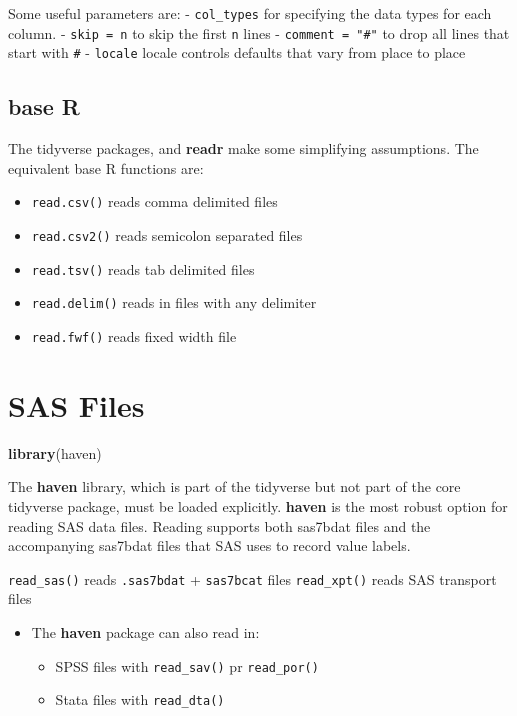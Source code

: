 \documentclass[]{book}
\newenvironment{Shaded}{\begin{snugshade}}{\end{snugshade}}
\newcommand{\KeywordTok}[1]{\textcolor[rgb]{0.13,0.29,0.53}{\textbf{#1}}}
\newcommand{\NormalTok}[1]{#1}
\providecommand{\tightlist}{%
  \setlength{\itemsep}{0pt}\setlength{\parskip}{0pt}}
\newenvironment{rmdblock}[1]
  {\begin{shaded*}
  \begin{itemize}
  \renewcommand{\labelitemi}{
    \raisebox{-.7\height}[0pt][0pt]{
      {\setkeys{Gin}{width=3em,keepaspectratio}\texttt{[image: images/\#1]}}
    }
  }
  \item
  }
  {
  \end{itemize}
  \end{shaded*}
  }
\newenvironment{rmdnote}
  {\begin{rmdblock}{note}}
  {\end{rmdblock}}
\theoremstyle{definition}
\theoremstyle{definition}
\theoremstyle{definition}
\theoremstyle{remark}
\begin{document}
Some useful parameters are: - \texttt{col\_types} for specifying the
data types for each column. - \texttt{skip\ =\ n} to skip the first
\texttt{n} lines - \texttt{comment\ =\ "\#"} to drop all lines that
start with \texttt{\#} - \texttt{locale} locale controls defaults that
vary from place to place

\subsection{base R}\label{base-r}

The tidyverse packages, and \textbf{readr} make some simplifying
assumptions. The equivalent base R functions are:

\begin{itemize}
\tightlist
\item
  \texttt{read.csv()} reads comma delimited files
\item
  \texttt{read.csv2()} reads semicolon separated files
\item
  \texttt{read.tsv()} reads tab delimited files
\item
  \texttt{read.delim()} reads in files with any delimiter
\item
  \texttt{read.fwf()} reads fixed width file
\end{itemize}

\section{SAS Files}\label{sas-files}

\begin{Shaded}
\begin{Highlighting}[]
\KeywordTok{library}\NormalTok{(haven)}
\end{Highlighting}
\end{Shaded}

The \textbf{haven} library, which is part of the tidyverse but not part
of the core tidyverse package, must be loaded explicitly. \textbf{haven}
is the most robust option for reading SAS data files. Reading supports
both sas7bdat files and the accompanying sas7bdat files that SAS uses to
record value labels.

\texttt{read\_sas()} reads \texttt{.sas7bdat} + \texttt{sas7bcat} files
\texttt{read\_xpt()} reads SAS transport files

\begin{rmdnote}
The \textbf{haven} package can also read in:

\begin{itemize}
\tightlist
\item
  SPSS files with \texttt{read\_sav()} pr \texttt{read\_por()}
\item
  Stata files with \texttt{read\_dta()}
\end{itemize}
\end{rmdnote}
\end{document}
